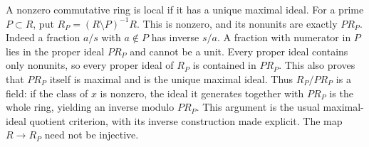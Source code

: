 A nonzero commutative ring is local if it has a unique maximal ideal.
For a prime $P\subset R$, put $R_P=(R\setminus P)^{-1}R$.
This is nonzero, and its nonunits are exactly $PR_P$.
Indeed a fraction $a/s$ with $a\notin P$ has inverse $s/a$.
A fraction with numerator in $P$ lies in the proper ideal $PR_P$ and
cannot be a unit. Every proper ideal contains only nonunits, so every
proper ideal of $R_P$ is contained in $PR_P$.
This also proves that $PR_P$ itself is maximal and is the unique
maximal ideal. Thus $R_P/PR_P$ is a field: if the class of $x$ is nonzero,
the ideal it generates together with $PR_P$ is the whole ring, yielding
an inverse modulo $PR_P$. This argument is the usual maximal-ideal
quotient criterion, with its inverse construction made explicit.
The map $R\to R_P$ need not be injective.

